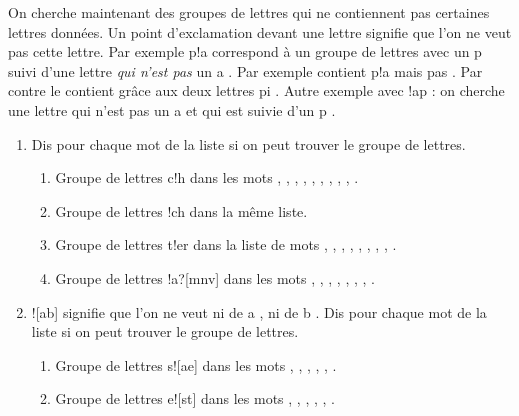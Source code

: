 \documentclass[class=report,crop=false, 12pt]{standalone}
\begin{document}
\begin{activite}

On cherche maintenant des groupes de lettres qui ne contiennent pas certaines lettres données. Un point d'exclamation devant une lettre signifie que l'on ne veut pas cette lettre. Par exemple \og p\!!a \fg{} correspond à un groupe de lettres avec un \og p \fg{} suivi d'une lettre \emph{qui n'est pas} un \og a \fg{}. Par exemple  contient  \og p\!!a \fg{} mais pas . Par contre  le contient grâce aux deux lettres \og pi \fg{}. Autre exemple avec \og \!!ap \fg{} : on cherche une lettre qui n'est pas un \og a \fg{} et qui est suivie d'un \og p \fg{}.


\begin{enumerate}
  \item Dis pour chaque mot de la liste si on peut trouver le groupe de lettres.
  \begin{enumerate}
    \item Groupe de lettres \og c\!!h \fg{} dans les mots , , , , , , , , , .
    \item Groupe de lettres \og \!!ch \fg{} dans la même liste.
    \item Groupe de lettres \og t\!!er \fg{} dans la liste de mots , , , , , , , , .
    \item Groupe de lettres \og [bcf]\!!a\!?[mnv] \fg{} dans les mots , , , , , , , .
  \end{enumerate}  
  
  \item \og \!![ab] \fg{} signifie que l'on ne veut ni de \og a \fg{}, ni de \og b \fg{}. Dis pour chaque mot de la liste si on peut trouver le groupe de lettres.
  \begin{enumerate}
    \item Groupe de lettres \og s\!![ae] \fg{} dans les mots , , , , , .
    \item Groupe de lettres \og [tp]e\!![st] \fg{} dans les mots , , , , , .
  \end{enumerate}

\end{enumerate}
\end{activite}
\end{document}
